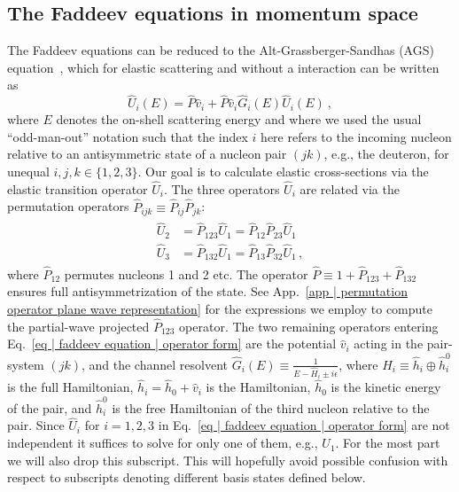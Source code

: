 \documentclass[aps,prc,showpacs,twocolumn,floatfix,nobibnotes,nofootinbib,amsmath,amssymb,longbibliography]{revtex4-2}
\begin{document}
\subsection{The Faddeev equations in momentum space}
\label{sec | faddeev in momentum space}
The Faddeev equations can be reduced to the Alt-Grassberger-Sandhas
(AGS) equation~\cite{Alt:1967fx}, which for elastic \Nd{} scattering
and without a \NNN{} interaction can be written as
\begin{equation}
	\hat{U}_i(E) = \hat{P}\hat{v}_i + \hat{P}\hat{v}_i\hat{G}_{i}(E)\hat{U}_i(E) \:,
	\label{eq | faddeev equation | operator form}
\end{equation} where $E$ denotes the on-shell scattering energy and where we
 used the usual ``odd-man-out'' notation such that the index $i$ here refers
 to the incoming nucleon relative to an antisymmetric state of a nucleon pair
 $(jk)$, e.g., the deuteron, for unequal $i, j,
 k \in \{1,2,3 \}$. Our goal is to
 calculate elastic cross-sections via the elastic transition operator $\hat
 {U}_i$. The three operators $\hat{U}_i$ are related via the permutation
 operators $\hat{P}_{ijk}\equiv\hat{P}_{ij}\hat{P}_{jk}$:
\begin{align}
	\begin{split}
	\hat{U}_2 &= \hat{P}_{123}\hat{U}_1 = \hat{P}_{12}\hat{P}_{23}\hat{U}_1 \\
	\hat{U}_3 &= \hat{P}_{132}\hat{U}_1 = \hat{P}_{13}\hat{P}_{32}\hat{U}_1 \, ,
	\end{split}
\end{align}
where $\hat{P}_{12}$ permutes nucleons 1 and 2 etc. The operator
$\hat{P}\equiv 1 + \hat{P}_{123} + \hat{P}_{132}$ ensures full
antisymmetrization of the \Nd{} state. See App.~\ref{app | permutation
  operator plane wave representation} for the expressions we employ to
compute the partial-wave projected $\hat{P}_{123}$ operator. The two
remaining operators entering Eq.~\eqref{eq | faddeev equation |
  operator form} are the \NN{} potential $\hat{v}_i$ acting in the
pair-system $(jk)$, and the channel resolvent
$\hat{G}_i(E)\equiv\frac{1}{E-\hat{H}_i\pm i\epsilon}$, where
$\hat{H}_i\equiv \hat{h}_i \oplus \hat{h}_i^{0}$ is the full
Hamiltonian, $\hat{h}_i = \hat{h}_0 + \hat{v}_i$ is the \NN{}
Hamiltonian, $\hat{h}_0$ is the kinetic energy of the pair, and
$\hat{h}_i^{0}$ is the free Hamiltonian of the third nucleon relative
to the pair. Since
$\hat{U}_i$ for $i=1,2,3$ in Eq.~\eqref{eq | faddeev equation |
	operator form} are not independent it suffices to solve for only one
of them, e.g., $U_1$. For the most part we will also drop this
subscript. This will hopefully avoid possible confusion with respect
to subscripts denoting different basis states defined below.
\end{document}
